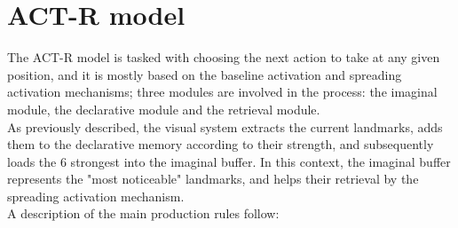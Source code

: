 \documentclass[a4paper,singleside,12pt]{report} %
\begin{document}
    \section{ACT-R model}
	The ACT-R model is tasked with choosing the next action to take at any given position, and it is mostly based on the baseline activation and spreading activation mechanisms; three modules are involved in the process: the imaginal module, the declarative module and the retrieval module.\\
	As previously described, the visual system extracts the current landmarks, adds them to the declarative memory according to their strength, and subsequently loads the 6 strongest into the imaginal buffer. In this context, the imaginal buffer represents the "most noticeable" landmarks, and helps their retrieval by the spreading activation mechanism.\\
	A description of the main production rules follow:
\end{document}
